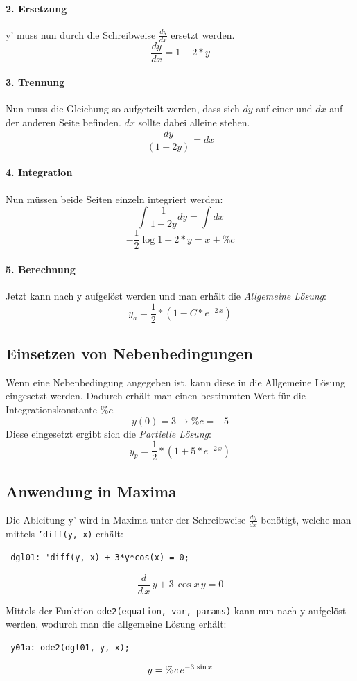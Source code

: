 \documentclass[a4paper,12pt]{article}
\begin{document}
\paragraph{2. Ersetzung}
y' muss nun durch die Schreibweise $\frac{dy}{dx}$ ersetzt werden.
$$\frac{dy}{dx} = 1 - 2*y$$
\paragraph{3. Trennung}
Nun muss die Gleichung so aufgeteilt werden, dass sich $dy$ auf einer und $dx$ auf der anderen Seite befinden. $dx$ sollte dabei alleine stehen.
$$\frac{dy}{(1-2y)} = dx$$
\paragraph{4. Integration}
Nun m\"ussen beide Seiten einzeln integriert werden:
$$\int\frac{1}{1 - 2y} dy = \int{dx}$$
$$-\frac{1}{2}\log{1 - 2*y} = x + \%c$$
\paragraph{5. Berechnung}
Jetzt kann nach y aufgel\"ost werden und man erh\"alt die \textit{Allgemeine L\"osung}:
$$y_a = \frac{1}{2}*(1-C*e^{-2\,x})$$
\subsection{Einsetzen von Nebenbedingungen}
Wenn eine Nebenbedingung angegeben ist, kann diese in die Allgemeine L\"osung eingesetzt werden. 
Dadurch erh\"alt man einen bestimmten Wert f\"ur die Integrationskonstante $\%c$.
$$y(0) = 3 \to \%c = -5$$
Diese eingesetzt ergibt sich die \textit{Partielle L\"osung}:
$$y_p = \frac{1}{2}*(1+5*e^{-2\,x})$$

\subsection{Anwendung in Maxima}
Die Ableitung y' wird in Maxima unter der Schreibweise $\frac{dy}{dx}$ benötigt, welche man mittels \texttt{'diff(y, x)} erhält:
\begin{verbatim}
 dgl01: 'diff(y, x) + 3*y*cos(x) = 0;        
\end{verbatim}
$${\frac{d}{d\,x}}\,y+3\,\cos x\,y=0$$

Mittels der Funktion \texttt{ode2(equation, var, params)} kann nun nach y aufgelöst werden, wodurch man die allgemeine Lösung erhält:
\begin{verbatim}
 y01a: ode2(dgl01, y, x);
\end{verbatim}
$$y={\it \%c}\,e^ {- 3\,\sin x }$$
\end{document}
